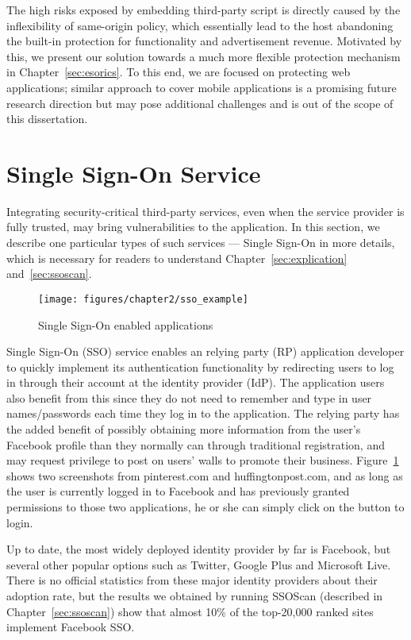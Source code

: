 The high risks exposed by embedding third-party script is directly caused by the inflexibility of same-origin policy, which essentially lead to the host abandoning the built-in protection for functionality and advertisement revenue.  Motivated by this, we present our solution towards a much more flexible protection mechanism in Chapter~\ref{sec:esorics}.  To this end, we are focused on protecting web applications; similar approach to cover mobile applications is a promising future research direction but may pose additional challenges and is out of the scope of this dissertation.

\section{Single Sign-On Service}

Integrating security-critical third-party services, even when the service provider is fully trusted, may bring vulnerabilities to the application.  In this section, we describe one particular types of such services --- Single Sign-On in more details, which is necessary for readers to understand Chapter~\ref{sec:explication} and~\ref{sec:ssoscan}.

\begin{figure}[bth]
\centering
\texttt{[image: figures/chapter2/sso\_example]}
\caption{Single Sign-On enabled applications}
\label{fig:sso_example}
\end{figure}

Single Sign-On (SSO) service enables an relying party (RP) application developer to quickly implement its authentication functionality by redirecting users to log in through their account at the identity provider (IdP).  The application users also benefit from this since they do not need to remember and type in user names/passwords each time they log in to the application.  The relying party has the added benefit of possibly obtaining more information from the user's Facebook profile than they normally can through traditional registration, and may request privilege to post on users' walls to promote their business.  Figure~\ref{fig:sso_example} shows two screenshots from pinterest.com and huffingtonpost.com, and as long as the user is currently logged in to Facebook and has previously granted permissions to those two applications, he or she can simply click on the button to login.  

Up to date, the most widely deployed identity provider by far is Facebook, but several other popular options such as Twitter, Google Plus and Microsoft Live.  There is no official statistics from these major identity providers about their adoption rate, but the results we obtained by running SSOScan (described in Chapter~\ref{sec:ssoscan}) show that almost 10\% of the top-20,000 ranked sites implement Facebook SSO.

